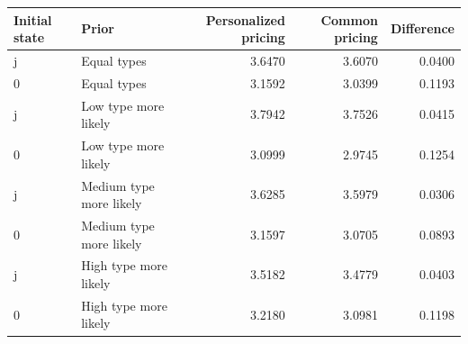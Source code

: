 \begin{tabular}{llrrr}\hline
Initial state & Prior & Personalized pricing & Common pricing & Difference\\\hline
j & Equal types & 3.6470 & 3.6070 & 0.0400 \\
0 & Equal types & 3.1592 & 3.0399 & 0.1193 \\
j & Low type more likely & 3.7942 & 3.7526 & 0.0415 \\
0 & Low type more likely & 3.0999 & 2.9745 & 0.1254 \\
j & Medium type more likely & 3.6285 & 3.5979 & 0.0306 \\
0 & Medium type more likely & 3.1597 & 3.0705 & 0.0893 \\
j & High type more likely & 3.5182 & 3.4779 & 0.0403 \\
0 & High type more likely & 3.2180 & 3.0981 & 0.1198 \\
\hline\end{tabular}
